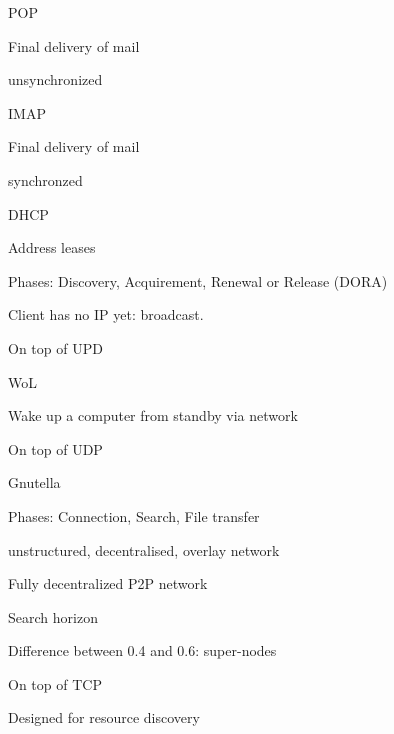 \documentclass[main.tex]{subfiles}
\begin{document}
\begin{card}{POP}
\item Final delivery of mail
\item unsynchronized
\end{card}

\begin{card}{IMAP}
\item Final delivery of mail
\item synchronzed
\end{card}

\begin{card}{DHCP}
\item Address leases
\item Phases: Discovery, Acquirement, Renewal or Release (DORA)
\item Client has no IP yet: broadcast.
\item On top of UPD
\end{card}

\begin{card}{WoL}
\item Wake up a computer from standby via network
\item On top of UDP
\end{card}



\begin{card}{Gnutella}
\item Phases: Connection, Search, File transfer
\item unstructured, decentralised, overlay network
\item Fully decentralized P2P network
\item Search horizon
\item Difference between 0.4 and 0.6: super-nodes
\item On top of TCP
\item Designed for resource discovery
\end{card}
\end{document}
